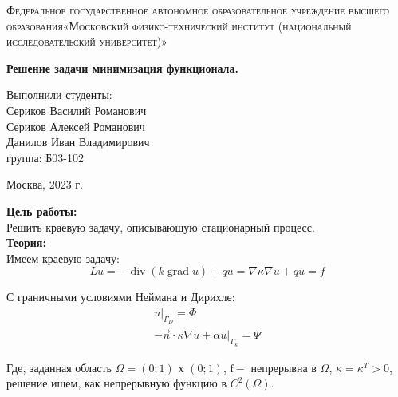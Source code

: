\documentclass[a4paper, 12pt]{article}%
\begin{document}
	\begin{titlepage}
		\begin{center}
			\textsc{Федеральное государственное автономное образовательное учреждение высшего образования«Московский физико-технический институт (национальный исследовательский университет)»\\[5mm]
			}
			
			\vfill
			
			\textbf{Решение задачи минимизация функционала.
				\\[50mm]
			}
			
		\end{center}
		
		\hfill
		\begin{minipage}{.5\textwidth}
			Выполнили студенты:\\[2mm]
			Сериков Василий Романович\\[2mm]
			Сериков Алексей Романович\\[2mm]
			Данилов Иван Владимирович\\[2mm]
			группа: Б03-102\\[5mm]
			
		\end{minipage}
		\vfill
		\begin{center}
			Москва, 2023 г.
		\end{center}
		
	\end{titlepage}
	
	\newpage
	\setcounter{page}{2}
	
	\textbf{Цель работы: }\\
	
	Решить краевую задачу, описывающую стационарный процесс.\\
	
	\textbf{Теория: }\\
	
	Имеем краевую задачу:
	$$
	L u=-\operatorname{div}(k \operatorname{grad} u)+q u=\nabla \kappa \nabla u+q u=f
	$$
	
	С граничными условиями Неймана и Дирихле:
	$$
	\begin{gathered}
		\left.u\right|_{\Gamma_D}=\Phi \\
		-\vec{n} \cdot \kappa \nabla u+\left.\alpha u\right|_{\Gamma_\kappa}=\Psi
	\end{gathered}
	$$
	
	Где, заданная область $\Omega=(0 ; 1)$ х $(0 ; 1)$, $\mathrm{f}-$ непрерывна в $\Omega$, $\kappa=\kappa^T>0$, решение ищем, как непрерывную функцию в $C^2(\Omega)$.
	
\end{document}
